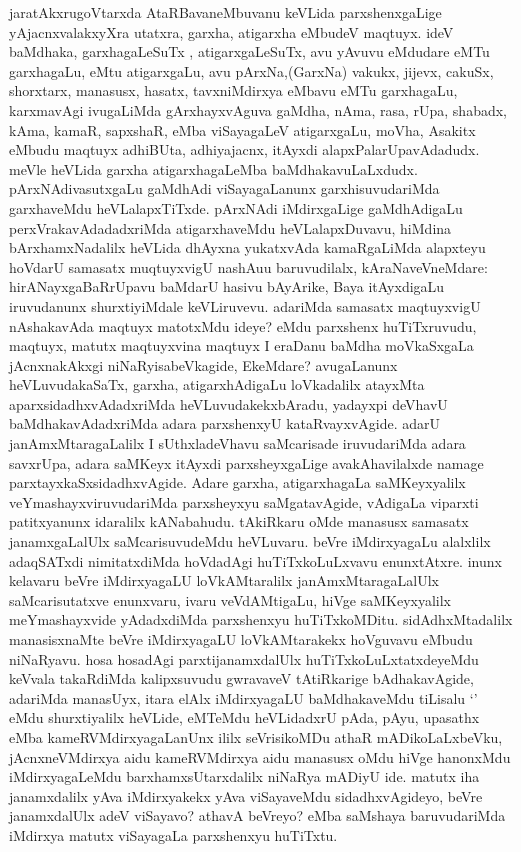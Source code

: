 \begin{artha}
jaratAkxrugoVtarxda AtaRBavaneMbuvanu keVLida parxshenxgaLige yAjacnxvalakxyXra utatxra, 
garxha, atigarxha eMbudeV maqtuyx. ideV baMdhaka, garxhagaLeSuTx , atigarxgaLeSuTx, avu 
yAvuvu eMdudare eMTu garxhagaLu, eMtu atigarxgaLu, avu pArxNa,(GarxNa) vakukx, jijevx, 
cakuSx, shorxtarx, manasusx, hasatx, tavxniMdirxya eMbavu eMTu garxhagaLu, karxmavAgi 
ivugaLiMda gArxhayxvAguva gaMdha, nAma, rasa, rUpa, shabadx, kAma, kamaR, sapxshaR, eMba 
viSayagaLeV atigarxgaLu, moVha, Asakitx eMbudu maqtuyx adhiBUta, adhiyajacnx, itAyxdi 
alapxPalarUpavAdadudx. meVle heVLida garxha atigarxhagaLeMba baMdhakavuLaLxdudx. 
pArxNAdivasutxgaLu gaMdhAdi viSayagaLanunx garxhisuvudariMda garxhaveMdu heVLalapxTiTxde.
pArxNAdi iMdirxgaLige gaMdhAdigaLu  perxVrakavAdadadxriMda atigarxhaveMdu 
heVLalapxDuvavu, hiMdina bArxhamxNadalilx heVLida dhAyxna yukatxvAda kamaRgaLiMda alapxteyu hoVdarU samasatx muqtuyxvigU nashAuu baruvudilalx, kAraNaveVneMdare: hirANayxgaBaRrUpavu baMdarU hasivu bAyArike, Baya itAyxdigaLu iruvudanunx shurxtiyiMdale keVLiruvevu. adariMda samasatx maqtuyxvigU nAshakavAda maqtuyx matotxMdu ideye? eMdu parxshenx  huTiTxruvudu, maqtuyx, matutx maqtuyxvina maqtuyx I eraDanu baMdha moVkaSxgaLa jAcnxnakAkxgi niNaRyisabeVkagide, EkeMdare? avugaLanunx heVLuvudakaSaTx, garxha, atigarxhAdigaLu loVkadalilx atayxMta aparxsidadhxvAdadxriMda heVLuvudakekxbAradu, yadayxpi deVhavU baMdhakavAdadxriMda adara parxshenxyU kataRvayxvAgide. adarU janAmxMtaragaLalilx I sUthxladeVhavu saMcarisade iruvudariMda adara savxrUpa, adara saMKeyx itAyxdi parxsheyxgaLige avakAhavilalxde namage parxtayxkaSxsidadhxvAgide. Adare garxha, atigarxhagaLa saMKeyxyalilx veYmashayxviruvudariMda parxsheyxyu saMgatavAgide, vAdigaLa viparxti patitxyanunx idaralilx kANabahudu. tAkiRkaru oMde manasusx samasatx janamxgaLalUlx saMcarisuvudeMdu heVLuvaru. beVre iMdirxyagaLu alalxlilx adaqSATxdi nimitatxdiMda hoVdadAgi huTiTxkoLuLxvavu enunxtAtxre. inunx kelavaru beVre iMdirxyagaLU loVkAMtaralilx janAmxMtaragaLalUlx saMcarisutatxve enunxvaru, ivaru veVdAMtigaLu, hiVge saMKeyxyalilx meYmashayxvide yAdadxdiMda parxshenxyu huTiTxkoMDitu. sidAdhxMtadalilx manasisxnaMte beVre iMdirxyagaLU loVkAMtarakekx hoVguvavu eMbudu niNaRyavu. hosa hosadAgi parxtijanamxdalUlx huTiTxkoLuLxtatxdeyeMdu keVvala takaRdiMda kalipxsuvudu gwravaveV tAtiRkarige  bAdhakavAgide, adariMda manasUyx, itara elAlx iMdirxyagaLU baMdhakaveMdu tiLisalu `\stext' eMdu shurxtiyalilx heVLide, eMTeMdu heVLidadxrU pAda, pAyu, upasathx eMba kameRVMdirxyagaLanUnx ililx seVrisikoMDu athaR mADikoLaLxbeVku, jAcnxneVMdirxya aidu kameRVMdirxya aidu manasusx oMdu hiVge hanonxMdu iMdirxyagaLeMdu barxhamxsUtarxdalilx niNaRya mADiyU ide. matutx iha janamxdalilx yAva iMdirxyakekx yAva viSayaveMdu sidadhxvAgideyo, beVre janamxdalUlx adeV viSayavo? athavA beVreyo? eMba saMshaya baruvudariMda iMdirxya matutx viSayagaLa parxshenxyu huTiTxtu.


\end{artha}

